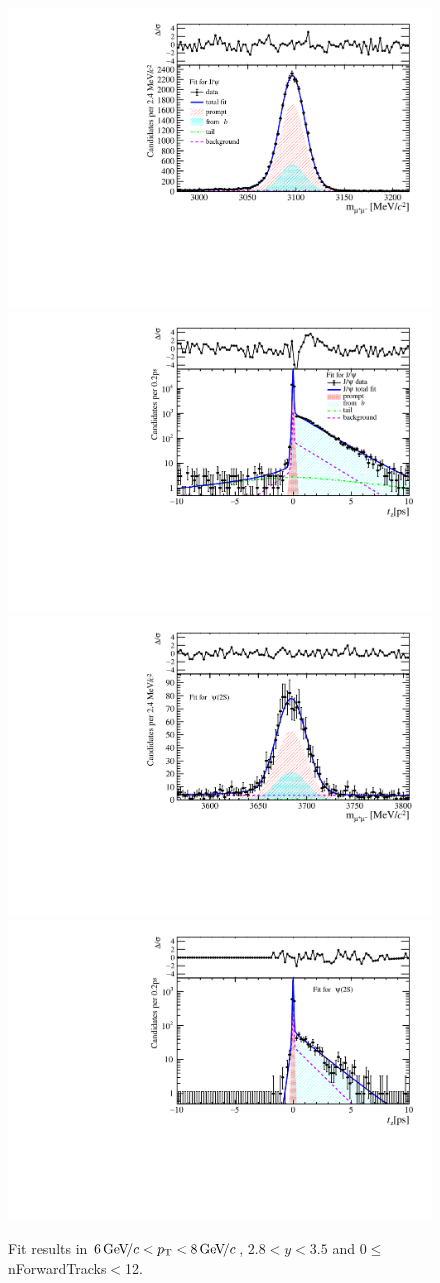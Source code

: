 \begin{figure}[H]
\begin{center}
\includegraphics[width=0.47\linewidth]{pdf/Jpsi/drawmassF/n1y2pt4.pdf}
\includegraphics[width=0.47\linewidth]{pdf/Jpsi/2DFitF/n1y2pt4.pdf}
\vspace*{-0.5cm}
\includegraphics[width=0.47\linewidth]{pdf/Psi2S/drawmassF/n1y2pt4.pdf}
\includegraphics[width=0.47\linewidth]{pdf/Psi2S/2DFitF/n1y2pt4.pdf}
\vspace*{-0.5cm}
\end{center}
\caption{Fit results in $6\text{\,Ge\kern -0.1em V\!/}c<p_{\mathrm{T}}<8\text{\,Ge\kern -0.1em V\!/}c$, $2.8<y<3.5$ and 0$\leq$nForwardTracks$<$12.}
\label{Fitn1y2pt4}
\end{figure}
